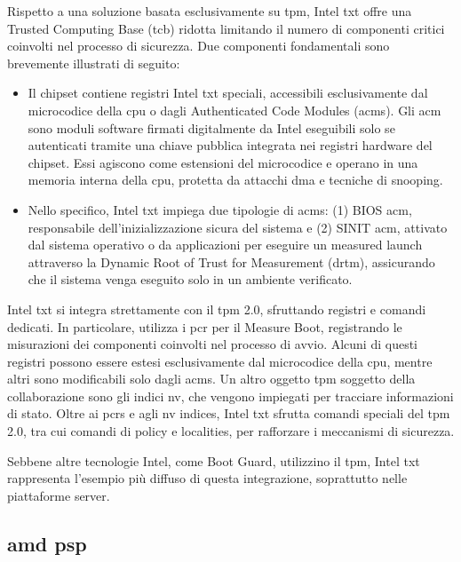 Rispetto a una soluzione basata esclusivamente su \acrshort{tpm}, Intel \acrshort{txt} offre una Trusted Computing Base (\acrshort{tcb}) ridotta limitando il numero di componenti critici coinvolti nel processo di sicurezza. Due componenti fondamentali sono brevemente illustrati di seguito:

\begin{itemize}
    \item Il chipset contiene registri Intel \acrshort{txt} speciali, accessibili esclusivamente dal microcodice della \acrshort{cpu} o dagli Authenticated Code Modules (\acrshort{acm}s). Gli \acrshort{acm} sono moduli software firmati digitalmente da Intel eseguibili solo se autenticati tramite una chiave pubblica integrata nei registri hardware del chipset. Essi agiscono come estensioni del microcodice e operano in una memoria interna della \acrshort{cpu}, protetta da attacchi \acrshort{dma} e tecniche di snooping.
    \item Nello specifico, Intel \acrshort{txt} impiega due tipologie di \acrshort{acm}s: (1) BIOS \acrshort{acm}, responsabile dell’inizializzazione sicura del sistema e (2) SINIT \acrshort{acm}, attivato dal sistema operativo o da applicazioni per eseguire un measured launch attraverso la Dynamic Root of Trust for Measurement (\acrshort{drtm}), assicurando che il sistema venga eseguito solo in un ambiente verificato.
\end{itemize}

Intel \acrshort{txt} si integra strettamente con il \acrshort{tpm} 2.0, sfruttando registri e comandi dedicati. In particolare, utilizza i \acrshort{pcr} per il Measure Boot, registrando le misurazioni dei componenti coinvolti nel processo di avvio. Alcuni di questi registri possono essere estesi esclusivamente dal microcodice della \acrshort{cpu}, mentre altri sono modificabili solo dagli \acrshort{acm}s. Un altro oggetto \acrshort{tpm} soggetto della collaborazione sono gli indici \acrshort{nv}, che vengono impiegati per tracciare informazioni di stato. Oltre ai \acrshort{pcr}s e agli \acrshort{nv} indices, Intel \acrshort{txt} sfrutta comandi speciali del \acrshort{tpm} 2.0, tra cui comandi di policy e localities, per rafforzare i meccanismi di sicurezza.

Sebbene altre tecnologie Intel, come Boot Guard, utilizzino il \acrshort{tpm}, Intel \acrshort{txt} rappresenta l’esempio più diffuso di questa integrazione, soprattutto nelle piattaforme server.

\subsection{\texorpdfstring{\acrshort{amd} \acrshort{psp}}{AMD PSP}}\label{subsec:amd_psp}

